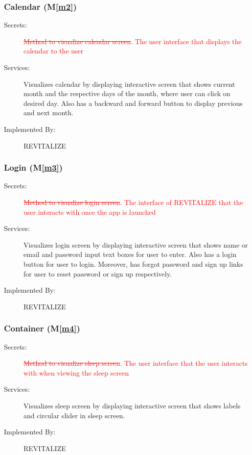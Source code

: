\documentclass[12pt, titlepage]{article}
\newcommand{\mref}[1]{M\ref{#1}}
\begin{document}
\subsubsection{Calendar (\mref{m2})}
\begin{description}
	\item[Secrets:]\textcolor{red}{\sout{Method to visualize calendar screen}}\textcolor{red}{. The user interface that displays the calendar to the user}
	\item[Services:]Visualizes calendar by displaying interactive screen that shows current month and the respective days of the month, where user can click on desired day. Also has a backward and forward button to display previous and next month.
	\item[Implemented By:] REVITALIZE
\end{description}

\subsubsection{Login (\mref{m3})}
\begin{description}
	\item[Secrets:]\textcolor{red}{\sout{Method to visualize login screen}}\textcolor{red}{. The interface of REVITALIZE that the user interacts with once the app is launched}
	\item[Services:]Visualizes login screen by displaying interactive screen that shows name or email and password input text boxes for user to enter. Also has a login button for user to login. Moreover, has forgot password and sign up links for user to reset password or sign up respectively.
	\item[Implemented By:] REVITALIZE
\end{description}

\subsubsection{Container (\mref{m4})}
\begin{description}
	\item[Secrets:]\textcolor{red}{\sout{Method to visualize sleep screen}}\textcolor{red}{. The user interface that the user interacts with when viewing the sleep screen}
	\item[Services:]Visualizes sleep screen by displaying interactive screen that shows labels and circular slider in sleep screen.
	\item[Implemented By:] REVITALIZE
\end{description}
\end{document}
